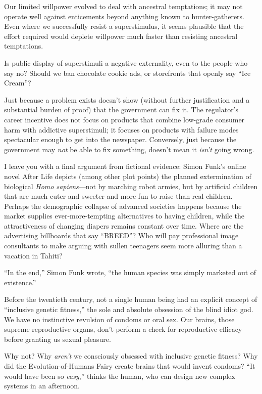 {
 Our limited willpower evolved to deal with ancestral temptations;
it may not operate well against enticements beyond anything known to
hunter-gatherers. Even where we successfully resist a superstimulus, it
seems plausible that the effort required would deplete willpower much
faster than resisting ancestral temptations.}

{
 Is public display of superstimuli a negative externality, even to
the people who say no? Should we ban chocolate cookie ads, or
storefronts that openly say ``Ice
Cream''?}

{
 Just because a problem exists doesn't show
(without further justification and a substantial burden of proof) that
the government can fix it. The regulator's career
incentive does not focus on products that combine low-grade consumer
harm with addictive superstimuli; it focuses on products with failure
modes spectacular enough to get into the newspaper. Conversely, just
because the government may \textit{not} be able to fix something,
doesn't mean it \textit{isn't} going
wrong.}

{
 I leave you with a final argument from fictional evidence: Simon
Funk's online novel After Life depicts (among other
plot points) the planned extermination of biological \textit{Homo
sapiens}{}---not by marching robot armies, but by artificial children
that are much cuter and sweeter and more fun to raise than real
children. Perhaps the demographic collapse of advanced societies
happens because the market supplies ever-more-tempting alternatives to
having children, while the attractiveness of changing diapers remains
constant over time. Where are the advertising billboards that say
``BREED''? Who will pay professional
image consultants to make arguing with sullen teenagers seem more
alluring than a vacation in Tahiti?}

{
 ``In the end,'' Simon Funk
wrote, ``the human species was simply marketed out of
existence.''}

\myendsectiontext


{
 Before the twentieth century, not a single human being had an
explicit concept of ``inclusive genetic
fitness,'' the sole and absolute obsession of the
blind idiot god. We have no instinctive revulsion of condoms or oral
sex. Our brains, those supreme reproductive organs,
don't perform a check for reproductive efficacy before
granting us sexual pleasure. }

{
 Why not? Why \textit{aren't} we consciously
obsessed with inclusive genetic fitness? Why did the
Evolution-of-Humans Fairy create brains that would invent condoms?
``It would have been so
\textit{easy},'' thinks the human, who can design new
complex systems in an afternoon.}

